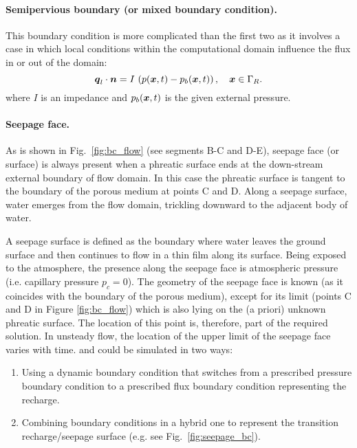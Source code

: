 \paragraph{Semipervious boundary (or mixed boundary condition).}
This boundary condition is more complicated than the first two as it involves a case
in which local conditions within the computational domain influence the flux in or
out of the domain:
\begin{equation}
  {\boldsymbol{q}}_l \cdot \boldsymbol{n} = I\, \left(p ({\boldsymbol{x}},t) - p_{b}({\boldsymbol{x}},t) \right), \quad {\boldsymbol{x}} \in \Gamma_R.
\end{equation}
where $I$ is an impedance and $p_{b}({\boldsymbol{x}},t)$ is the given external pressure.

\paragraph{Seepage face.}
As is shown in Fig.~\ref{fig:bc_flow} (see segments B-C and D-E), seepage face (or surface) 
is always present when a phreatic surface ends at the down-stream external boundary of flow domain.
In this case the phreatic surface is tangent to the boundary of the porous medium at points C and D.
Along a seepage surface, water emerges from the flow domain, trickling downward to the adjacent body of water.

A seepage surface is defined as the boundary where water leaves the ground surface and then continues to flow in a thin film along its surface.
Being exposed to the atmosphere, the presence along the seepage face is atmospheric pressure (i.e. capillary pressure $p_{c}=0$).
The geometry of the seepage face is known (as it coincides with the boundary of the porous medium), except for its limit (points C and D in Figure \ref{fig:bc_flow}) which is also lying on the (a priori) unknown phreatic surface.
The location of this point is, therefore, part of the required solution.
In unsteady flow, the location of the upper limit of the seepage face varies with time.
and could be simulated in two ways:
\begin{enumerate}
\item Using a dynamic boundary condition that switches from a prescribed pressure boundary condition
to a prescribed flux boundary condition representing the recharge.
\item Combining boundary conditions in a hybrid one to represent the transition recharge/seepage 
surface (e.g. see Fig.~\ref{fig:seepage_bc}).
\end{enumerate}

